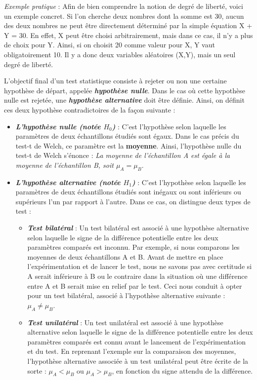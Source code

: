 \documentclass[10pt, oneside, a4paper]{article}
\begin{document}
\vspace{+0.1 cm}\hspace{-0.5 cm}\textit{Exemple pratique} : Afin de bien comprendre la notion de degré de liberté, voici un exemple concret. 
Si l'on cherche deux nombres dont la somme est 30, aucun des deux nombres ne peut être directement déterminé par la simple équation X + Y = 30. En effet, X peut être choisi arbitrairement, mais dans ce cas, il n'y a plus de choix pour Y. Ainsi, si on choisit  20 comme valeur pour X, Y vaut obligatoirement 10. Il y a donc deux variables aléatoires (X,Y), mais un seul degré de liberté.

L'objectif final d'un test statistique consiste à rejeter ou non une certaine hypothèse de départ, appelée \textbf{\textit{hypothèse nulle}}. Dans le cas où cette hypothèse nulle est rejetée, une \textbf{\textit{hypothèse alternative}} doit être définie. Ainsi, on définit ces deux hypothèse contradictoires de la façon suivante : 
\begin{itemize}
\item \textbf{\textit{L'hypothèse nulle (notée $H_{0}$)}} : C'est l'hypothèse selon laquelle les paramètres de deux échantillons étudiés sont égaux. Dans le cas précis du test-t de Welch, ce paramètre est la \textbf{moyenne}. Ainsi, l'hypothèse nulle du test-t de Welch s'énonce : \textit{La moyenne de l'échantillon A est égale à la moyenne de l'échantillon B, soit $\mu_{A} = \mu_{B}$}.
\item \textbf{\textit{L'hypothèse alternative (notée $H_{1}$)}} : C'est l'hypothèse selon laquelle les paramètres de deux échantillons étudiés sont inégaux ou sont inférieurs ou supérieurs l'un par rapport à l'autre. Dans ce cas, on distingue deux types de test : 
\begin{itemize}
\item \textbf{\textit{Test bilatéral}} : Un test bilatéral est associé à une hypothèse alternative selon laquelle le signe de la différence potentielle entre les deux paramètres comparés est inconnu. Par exemple, si nous comparons les moyennes de deux échantillons A et B. Avant de mettre en place l’expérimentation et de lancer le test, nous ne savons pas avec certitude si A serait inférieure à B ou le contraire dans la situation où une différence entre A et B serait mise en relief par le test. Ceci nous conduit à opter pour un test bilatéral, associé à l’hypothèse alternative suivante : $\mu_{A} \neq \mu_{B}$. 
\item \textbf{\textit{Test unilatéral}} : Un test unilatéral est associé à une hypothèse alternative selon laquelle le signe de la différence potentielle entre les deux paramètres comparés est connu avant le lancement de l’expérimentation et du test. En reprenant l'exemple sur la comparaison des moyennes, l’hypothèse alternative associée à un test unilatéral peut être écrite de la sorte : $\mu_{A} < \mu_{B}$ ou $\mu_{A} > \mu_{B}$, en fonction du signe attendu de la différence. \\
\end{itemize}
\end{itemize}
\end{document}

